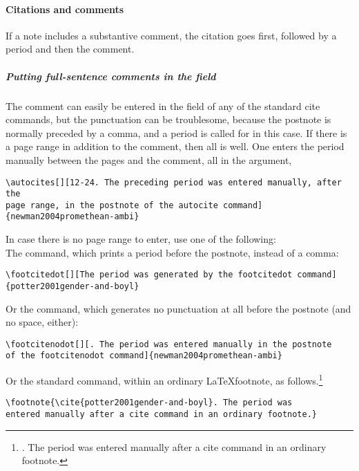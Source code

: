 \documentclass{ltxdockit}[2010/02/12]
\begin{document}
\paragraph{Citations and comments}
If a note includes a substantive comment, the citation goes first, followed by a period and then the comment.
\subparagraph{Putting full-sentence comments in the  field}
The comment can easily be entered in the  field of any of the standard cite commands, but the punctuation can be troublesome, because the postnote is normally preceded by a comma, and a period is called for in this case. If there is a page range in addition to the comment, then all is well. One enters the period manually between the pages and the comment, all in the  argument, \eg\autocites[][12-24. The preceding period was entered manually, after the page range, in the postnote of the autocite command]{newman2004promethean-ambi}
\begin{verbatim}
\autocites[][12-24. The preceding period was entered manually, after the 
page range, in the postnote of the autocite command]
{newman2004promethean-ambi}
\end{verbatim}
In case there is no page range to enter, use one of the following:\\
The  command, which prints a period before the postnote, instead of a comma:
\begin{verbatim}
\footcitedot[][The period was generated by the footcitedot command]
{potter2001gender-and-boyl}
\end{verbatim}
Or the  command, which generates no punctuation at all before the postnote (and no space, either):
\begin{verbatim}
\footcitenodot[][. The period was entered manually in the postnote 
of the footcitenodot command]{newman2004promethean-ambi}
\end{verbatim}
Or the standard   command, within an ordinary \LaTeX footnote, as follows.\footnote{\cite{potter2001gender-and-boyl}. The period was entered manually after a cite command in an ordinary footnote.}
\begin{verbatim}
\footnote{\cite{potter2001gender-and-boyl}. The period was 
entered manually after a cite command in an ordinary footnote.}
\end{verbatim}
\end{document}
